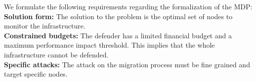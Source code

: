 \label{sec:mdp-reqiorements}
We formulate the following requirements regarding the formalization of the MDP:\\
\textbf{Solution form: } The solution to the problem is the optimal set of nodes to monitor the infrastructure.\\
\textbf{Constrained budgets: } The defender has a limited financial budget and a maximum performance impact threshold.
This implies that the whole infrastructure cannot be defended.\\
\textbf{Specific attacks: } The attack on the migration process must be fine grained and target specific nodes.
